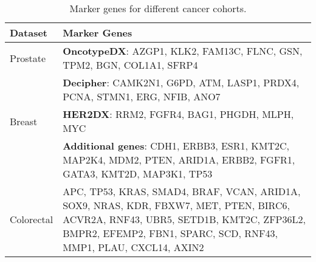\clearpage

\begin{table}[h!]
    \centering
    \caption{Marker genes for different cancer cohorts.}
    \begin{tabular}{|p{3cm}|p{12cm}|} 
        \toprule
        \textbf{Dataset} & \textbf{Marker Genes} \\
        \midrule
        Prostate & \textbf{OncotypeDX}: AZGP1, KLK2, FAM13C, FLNC, GSN, TPM2, BGN, COL1A1, SFRP4 \\ 
                 & \textbf{Decipher}: CAMK2N1, G6PD, ATM, LASP1, PRDX4, PCNA, STMN1, ERG, NFIB, ANO7 \\
        \midrule
        Breast & \textbf{HER2DX}: RRM2, FGFR4, BAG1, PHGDH, MLPH, MYC \\
        & \textbf{Additional genes}: CDH1, ERBB3, ESR1, KMT2C, MAP2K4, MDM2, PTEN, ARID1A, ERBB2, FGFR1, GATA3, KMT2D, MAP3K1, TP53 \\
        \midrule
        Colorectal & APC, TP53, KRAS, SMAD4, BRAF, VCAN, ARID1A, SOX9, NRAS, KDR, FBXW7, MET, PTEN, BIRC6, ACVR2A, RNF43, UBR5, SETD1B, KMT2C, ZFP36L2, BMPR2, EFEMP2, FBN1, SPARC, SCD, RNF43, MMP1, PLAU, CXCL14, AXIN2 \\
        \bottomrule
    \end{tabular}
    \label{tab:marker_genes}
\end{table}






